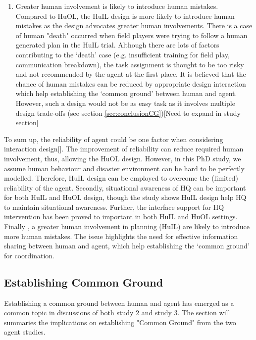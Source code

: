 \begin{enumerate}
\item Greater human involvement is likely to introduce human mistakes. \\
Compared to HuOL, the HuIL design is more likely to introduce human mistakes as the design advocates greater human involvements. There is a case of  human "death" occurred  when field players were trying to follow a human generated plan in the HuIL trial.  Although there are lots of factors contributing to the `death' case (e.g. insufficient training for field play, communication breakdown), the task assignment is thought to be too risky and not recommended by the agent at the first place. It is believed that the chance of human mistakes can be reduced by appropriate design interaction which help establishing the `common ground' between human and agent. However, such a design would not be as easy task as it involves multiple design trade-offs  (see section \ref{sec:conclusionCG})[Need to expand in study section]

\end{enumerate}

To sum up, the reliability of agent could be one factor when considering interaction design[]. The improvement of reliability can reduce required human involvement, thus, allowing the HuOL design. However, in this PhD study, we assume human behaviour and disaster environment can be hard to be perfectly modelled. Therefore, HuIL design can be employed to overcome the (limited) reliability of the agent. Secondly, situational awareness of HQ can be important for both HuIL and HuOL design, though the study shows HuIL design help HQ to maintain situational awareness. Further, the interface support for HQ intervention has been proved to important in both HuIL and HuOL settings. Finally , a greater human involvement in planning (HuIL) are likely to introduce more human mistakes. The issue highlights the need for effective information sharing between human and agent, which help establishing the `common ground' for coordination. \\


\subsection{Establishing Common Ground} \label{sec:conclustionCG}
Establishing a common ground between human and agent has emerged as a common topic in discussions of both study 2 and study 3. The section will summaries the implications on establishing "Common Ground" from the two agent studies. \\

